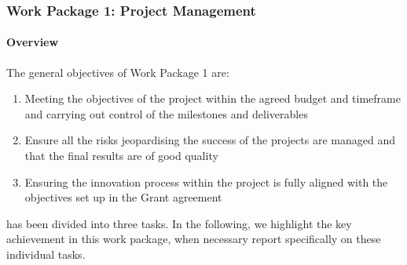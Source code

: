 \subsubsection{Work Package 1: Project Management}


\paragraph{Overview}


The general objectives of Work Package 1 are:

\begin{enumerate}
\item{Meeting the objectives of the project within the agreed budget and timeframe and carrying out control of the milestones and deliverables}
\item{Ensure all the risks jeopardising the success of the projects are managed and that the final results are of good quality}
\item{Ensuring the innovation process within the project is fully aligned with the objectives set up in the Grant agreement}
\end{enumerate}

 has been divided into three tasks. In the
following, we highlight the key achievement in this work package, when
necessary report specifically on these individual tasks.


